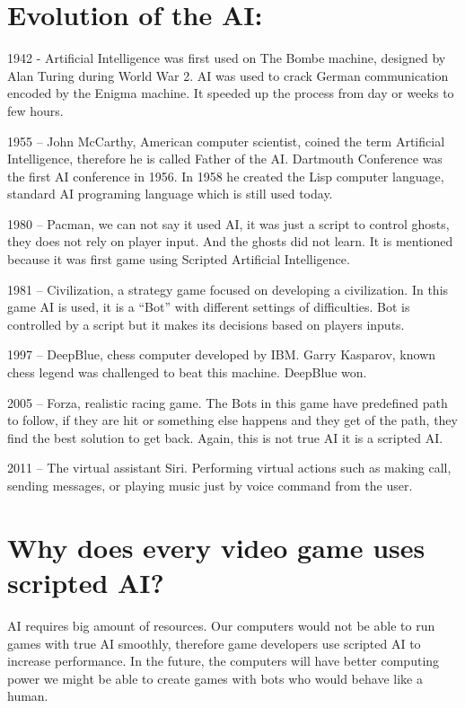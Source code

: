 \documentclass[12pt,twoside,english,a4paper]{article}
\begin{document}
\section{Evolution of the AI: } \label{2part}

1942 - Artificial Intelligence was first used on The Bombe machine, designed by Alan Turing during World War 2.
AI was used to crack German communication encoded by the Enigma machine. It speeded up the process from day or weeks to few hours.

1955 – John McCarthy, American computer scientist, coined the term Artificial Intelligence, therefore he is called Father of the AI.
Dartmouth Conference was the first AI conference in 1956. In 1958 he created the Lisp computer language, standard AI programing language which is still used today.

1980 – Pacman, we can not say it used AI, it was just a script to control ghosts, they does not rely on player input.
And the ghosts did not learn. It is mentioned because it was first game using Scripted Artificial Intelligence.  

1981 – Civilization, a strategy game focused on developing a civilization. In this game AI is used, it is a “Bot” with different settings of difficulties.
Bot is controlled by a script but it makes its decisions based on players inputs.

1997 – DeepBlue, chess computer developed by IBM. Garry Kasparov, known chess legend was challenged to beat this machine. DeepBlue won. 

2005 – Forza, realistic racing game. The Bots in this game have predefined path to follow, 
if they are hit or something else happens and they get of the path, they find the best solution to get back. Again, this is not true AI it is a scripted AI.

2011 – The virtual assistant Siri. Performing virtual actions such as making call, sending messages, or playing music just by voice command from the user.





\section{Why does every video game uses scripted AI?} \label{3part}

AI requires big amount of resources. Our computers would not be able to run games
with true AI smoothly, therefore game developers use scripted AI to increase performance.
In the future, the computers will have better computing power we 
might be able to create games with bots who would behave like a human. 
\end{document}
